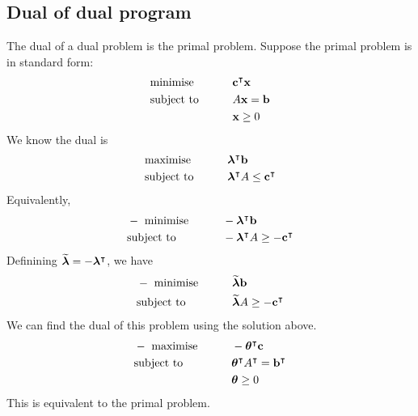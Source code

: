\subsection{Dual of dual program}
The dual of a dual problem is the primal problem.
Suppose the primal problem is in standard form:
\begin{alignat*}{2}
	 & \text{minimise}   & \qquad & \vb c^\intercal \vb x \\
	 & \text{subject to} &        & A \vb x = \vb b        \\
	 &                   &        & \vb x \geq 0
\end{alignat*}
We know the dual is
\begin{alignat*}{2}
	 & \text{maximise}   & \qquad & \bm \lambda^\intercal \vb b                   \\
	 & \text{subject to} &        & \bm \lambda^\intercal A \leq \vb c^\intercal \\
\end{alignat*}
Equivalently,
\begin{alignat*}{2}
	 & -\text{ minimise} & \qquad & -\bm \lambda^\intercal \vb b                    \\
	 & \text{subject to} &        & -\bm \lambda^\intercal A \geq -\vb c^\intercal \\
\end{alignat*}
Definining \( \widetilde{\bm \lambda} = -\bm\lambda^\intercal \), we have
\begin{alignat*}{2}
	 & -\text{ minimise} & \qquad & \widetilde{\bm \lambda} \vb b                    \\
	 & \text{subject to} &        & \widetilde{\bm \lambda} A \geq -\vb c^\intercal \\
\end{alignat*}
We can find the dual of this problem using the solution above.
\begin{alignat*}{2}
	 & -\text{ maximise} & \qquad & -\bm \theta^\intercal \vb c                          \\
	 & \text{subject to} &        & \bm \theta^\intercal A^\intercal = \vb b^\intercal \\
	 &                   &        & \bm \theta \geq 0
\end{alignat*}
This is equivalent to the primal problem.

